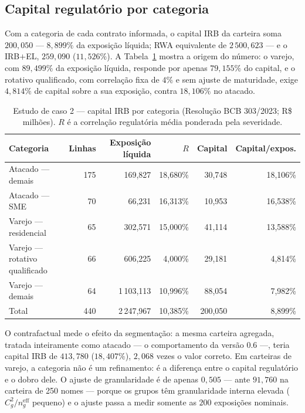 \documentclass[11pt,a4paper]{article}
\begin{document}
\subsection{Capital regulatório por categoria}

Com a categoria de cada contrato informada, o capital IRB da carteira soma $200{,}050$ --- $8{,}899\%$ da exposição líquida; RWA equivalente de $2\,500{,}623$ --- e o IRB$+$EL, $259{,}090$ ($11{,}526\%$). A Tabela~\ref{tab:irb-seg} mostra a origem do número: o varejo, com $89{,}499\%$ da exposição líquida, responde por apenas $79{,}155\%$ do capital, e o rotativo qualificado, com correlação fixa de $4\%$ e sem ajuste de maturidade, exige $4{,}814\%$ de capital sobre a sua exposição, contra $18{,}106\%$ no atacado.

\begin{table}[htb]
\centering\small
\caption{Estudo de caso 2 --- capital IRB por categoria (Resolução BCB 303/2023; R\$ milhões). $R$ é a correlação regulatória média ponderada pela severidade.}
\label{tab:irb-seg}
\setlength{\tabcolsep}{4pt}
\begin{tabular}{lrrrrr}
\toprule
Categoria & Linhas & Exposição líquida & $R$ & Capital & Capital/expos. \\
\midrule
Atacado — demais & 175 & 169{,}827 & 18{,}680\% & 30{,}748 & 18{,}106\% \\
Atacado — SME & 70 & 66{,}231 & 16{,}313\% & 10{,}953 & 16{,}538\% \\
Varejo — residencial & 65 & 302{,}571 & 15{,}000\% & 41{,}114 & 13{,}588\% \\
Varejo — rotativo qualificado & 66 & 606{,}225 & 4{,}000\% & 29{,}181 & 4{,}814\% \\
Varejo — demais & 64 & 1\,103{,}113 & 10{,}996\% & 88{,}054 & 7{,}982\% \\
\midrule
Total & 440 & 2\,247{,}967 & 10{,}385\% & 200{,}050 & 8{,}899\% \\
\bottomrule
\end{tabular}
\end{table}

O contrafactual mede o efeito da segmentação: a mesma carteira agregada, tratada inteiramente como atacado --- o comportamento da versão 0.6 ---, teria capital IRB de $413{,}780$ ($18{,}407\%$), $2{,}068$ vezes o valor correto. Em carteiras de varejo, a categoria não é um refinamento: é a diferença entre o capital regulatório e o dobro dele. O ajuste de granularidade é de apenas $0{,}505$ --- ante $91{,}760$ na carteira de 250 nomes --- porque os grupos têm granularidade interna elevada ($C_g^2/n_g^{\mathrm{eff}}$ pequeno) e o ajuste passa a medir somente as $200$ exposições nominais.
\end{document}
